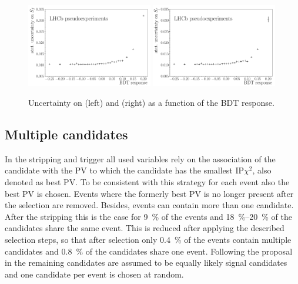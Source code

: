 \begin{figure}[tbp]
    \centering
    \includegraphics[width=0.49\textwidth]{06selection/figs/sensitiv_Sf.pdf}
    \includegraphics[width=0.49\textwidth]{06selection/figs/sensitiv_Sfbar.pdf}
    \caption{Uncertainty on \Sf (left) and \Sfbar (right) as a function of the \ac{BDT} response.}
    \label{fig:BDTopt}
\end{figure}

\subsection{Multiple candidates}
\label{sec:MultCands}

In the stripping and trigger all used variables rely on the association of the \Bz candidate with the \ac{PV} to which the candidate has the smallest $\text{IP}\chi^2$, also denoted as best \ac{PV}.
To be consistent with this strategy for each event also the best \ac{PV} is chosen.
Events where the formerly best \ac{PV} is no longer present after the selection are removed.
Besides, events can contain more than one \Bz candidate.
After the stripping this is the case for \SI{9}{\percent} of the events and \SIrange{18}{20}{\percent} of the \Bz candidates share the same event.
This is reduced after applying the described selection steps, so that after selection only \SI{0.4}{\percent} of the events contain multiple candidates and \SI{0.8}{\percent} of the \Bz candidates share one event.
Following the proposal in \cite{Koppenburg:2017zsh} the remaining candidates are assumed to be equally likely signal candidates and one candidate per event is chosen at random.

